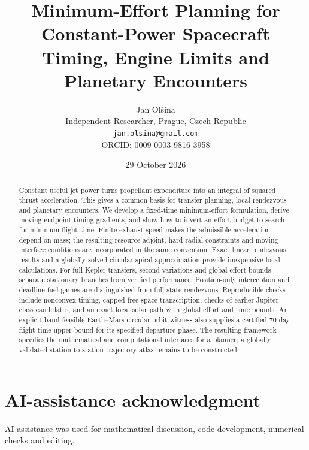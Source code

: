 \documentclass[10pt,a4paper,twocolumn]{article}
\title{Minimum-Effort Planning for Constant-Power Spacecraft\\
Timing, Engine Limits and Planetary Encounters}
\author{Jan Ol\v{s}ina\\\small Independent Researcher, Prague, Czech Republic\\
\small \texttt{jan.olsina@gmail.com}\\\small ORCID: 0009-0003-9816-3958}
\date{29 October 2026}
\begin{document}
\maketitle
\begin{abstract}
Constant useful jet power turns propellant expenditure into an integral
of squared thrust acceleration. This gives a common basis for transfer
planning, local rendezvous and planetary encounters. We develop a
fixed-time minimum-effort formulation, derive moving-endpoint timing
gradients, and show how to invert an effort budget to search for minimum
flight time. Finite exhaust speed makes the admissible acceleration depend
on mass; the resulting resource adjoint, hard radial constraints and
moving-interface conditions are incorporated in the same convention.
Exact linear rendezvous results and a globally solved circular-spiral
approximation provide inexpensive local calculations. For full Kepler
transfers, second variations and global effort bounds separate stationary
branches from verified performance. Position-only interception and
deadline-fuel games are distinguished from full-state rendezvous.
Reproducible checks include nonconvex timing, capped free-space
transcription, checks of earlier Jupiter-class candidates, and an
exact local solar path with global effort and time bounds. An explicit
band-feasible Earth--Mars circular-orbit witness also supplies a certified
70-day flight-time upper bound for its specified departure phase.
The resulting framework specifies the mathematical
and computational interfaces for a planner; a globally validated
station-to-station trajectory atlas remains to be constructed.
\end{abstract}










\appendix

\section*{AI-assistance acknowledgment}
AI assistance was used for mathematical discussion, code development,
numerical checks and editing.
\raggedright


\end{document}
